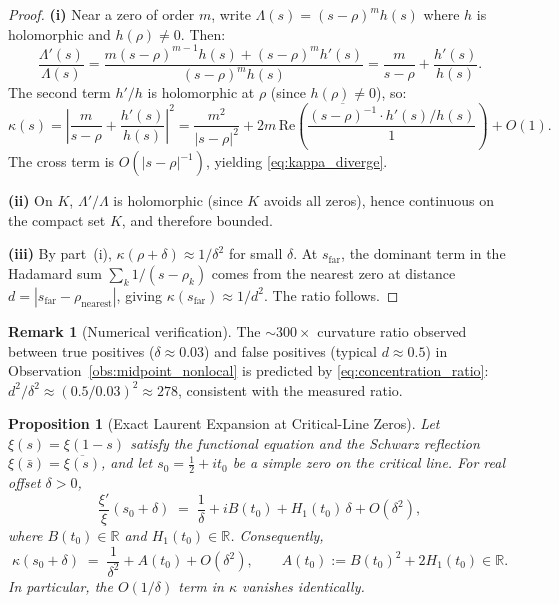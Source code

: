 \documentclass[11pt, a4paper]{article}
\theoremstyle{definition}
\newtheorem{remark}{Remark}[section]
\theoremstyle{plain}
\newtheorem{proposition}[theorem]{Proposition}
\begin{document}
\begin{proof}
\textbf{(i)} Near a zero of order $m$, write
$\Lambda(s) = (s-\rho)^m h(s)$ where $h$ is holomorphic and
$h(\rho) \neq 0$. Then:
\[
  \frac{\Lambda'(s)}{\Lambda(s)}
  = \frac{m(s-\rho)^{m-1}h(s) + (s-\rho)^m h'(s)}{(s-\rho)^m h(s)}
  = \frac{m}{s - \rho} + \frac{h'(s)}{h(s)}.
\]
The second term $h'/h$ is holomorphic at $\rho$ (since $h(\rho)\neq 0$),
so:
\[
  \kappa(s) = \left|\frac{m}{s-\rho} + \frac{h'(s)}{h(s)}\right|^2
  = \frac{m^2}{|s-\rho|^2}
  + 2m\,\mathrm{Re}\!\left(\frac{\overline{(s-\rho)^{-1}}\cdot h'(s)/h(s)}{1}\right)
  + O(1).
\]
The cross term is $O(|s-\rho|^{-1})$, yielding \eqref{eq:kappa_diverge}.

\textbf{(ii)} On $K$, $\Lambda'/\Lambda$ is holomorphic
(since $K$ avoids all zeros), hence continuous on the compact set $K$,
and therefore bounded.

\textbf{(iii)} By part~(i), $\kappa(\rho+\delta) \approx 1/\delta^2$
for small $\delta$. At $s_{\mathrm{far}}$, the dominant term in the
Hadamard sum $\sum_k 1/(s-\rho_k)$ comes from the nearest zero at
distance $d = |s_{\mathrm{far}} - \rho_{\mathrm{nearest}}|$, giving
$\kappa(s_{\mathrm{far}}) \approx 1/d^2$. The ratio follows.
\end{proof}

\begin{remark}[Numerical verification]
\label{rem:curvature_numerical}
The $\sim 300\times$ curvature ratio observed between true positives
($\delta \approx 0.03$) and false positives
(typical $d \approx 0.5$) in Observation~\ref{obs:midpoint_nonlocal}
is predicted by \eqref{eq:concentration_ratio}:
$d^2/\delta^2 \approx (0.5/0.03)^2 \approx 278$, consistent with
the measured ratio.
\end{remark}

\begin{proposition}[Exact Laurent Expansion at Critical-Line Zeros]
\label{prop:kappa_exact_expansion}
Let $\xi(s) = \xi(1-s)$ satisfy the functional equation and the Schwarz reflection
$\xi(\bar{s}) = \overline{\xi(s)}$, and let $s_0 = \tfrac{1}{2} + it_0$ be a simple
zero on the critical line.  For real offset $\delta > 0$,
\begin{equation}
  \frac{\xi'}{\xi}(s_0 + \delta)
  \;=\; \frac{1}{\delta} + iB(t_0) + H_1(t_0)\,\delta + O(\delta^2),
  \label{eq:conn_expansion}
\end{equation}
where $B(t_0) \in \mathbb{R}$ and $H_1(t_0) \in \mathbb{R}$.
Consequently,
\begin{equation}
  \kappa(s_0 + \delta)
  \;=\; \frac{1}{\delta^2} + A(t_0) + O(\delta^2),
  \qquad
  A(t_0) := B(t_0)^2 + 2H_1(t_0) \in \mathbb{R}.
  \label{eq:kappa_exact}
\end{equation}
In particular, the $O(1/\delta)$ term in $\kappa$ vanishes identically.
\end{proposition}
\end{document}
